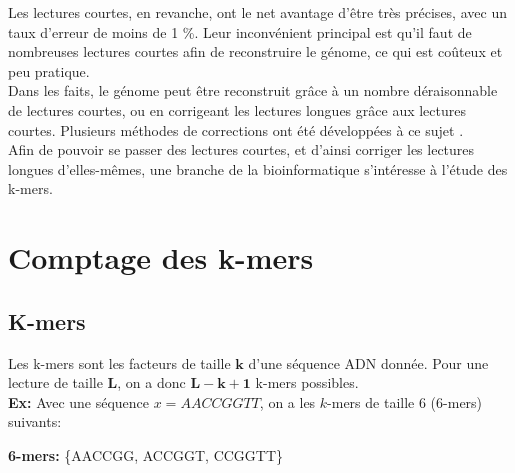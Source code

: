 \documentclass{report}
\begin{document}
      Les lectures courtes, en revanche, ont le net avantage d'être très précises, avec un taux d'erreur de moins de 1 \%. Leur inconvénient principal est qu'il faut de nombreuses lectures courtes afin de reconstruire le génome, ce qui est coûteux et peu pratique.\\

      Dans les faits, le génome peut être reconstruit grâce à un nombre déraisonnable de lectures courtes, ou en corrigeant les lectures longues grâce aux lectures courtes. Plusieurs méthodes de corrections ont été développées à ce sujet \cite{Morisse2017}.\\

      Afin de pouvoir se passer des lectures courtes, et d'ainsi corriger les lectures longues d'elles-mêmes, une branche de la bioinformatique s'intéresse à l'étude des k-mers.\\
    \newpage
  \chapter{Comptage des k-mers}
    \section{K-mers}
      Les k-mers sont les facteurs de taille $\mathbf{k}$ d'une séquence ADN donnée. Pour une lecture de taille $\mathbf{L}$, on a donc $\mathbf{L - k + 1}$ k-mers possibles.\bigskip\\
      \textbf{Ex:} Avec une séquence $x = AACCGGTT$, on a les $k$-mers de taille $6$ ($6$-mers) suivants:\\
      \begin{center}\end{center}
      \textbf{6-mers:} \{AACCGG, ACCGGT, CCGGTT\}\bigskip\\
\end{document}
